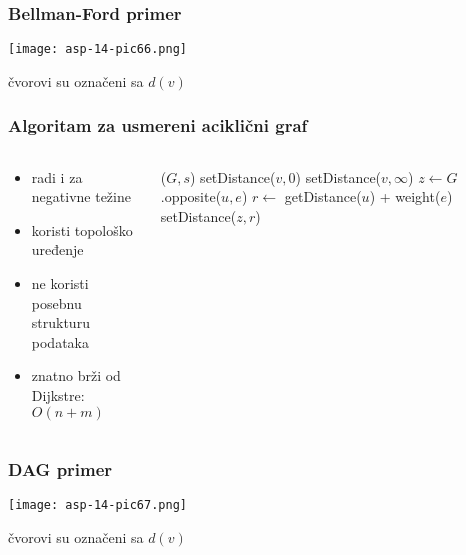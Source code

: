 \documentclass[compress,aspectratio=169]{beamer}
\begin{document}
\begin{frame}[fragile]
  \frametitle{Bellman-Ford primer}
  \begin{center}
    \texttt{[image: asp-14-pic66.png]}
  \end{center}
  \hfill {\scriptsize čvorovi su označeni sa $d(v)$}
\end{frame}

\begin{frame}[fragile,shrink=2]
  \frametitle{Algoritam za usmereni aciklični graf}
  \begin{columns}
    \begin{column}[t]{5cm}
      \begin{itemize}
        \item radi i za negativne težine
        \item koristi topološko uređenje
        \item ne koristi posebnu strukturu podataka
        \item znatno brži od Dijkstre: $O(n+m)$
      \end{itemize}
    \end{column}
    \begin{column}[t]{7cm}{\small
      \begin{algorithmic}
        \STATE {}($G,s$)
            \STATE setDistance($v,0$)
          \ELSE
            \STATE setDistance($v,\infty$)
          \ENDIF
        \ENDFOR
        \STATE {}
          \STATE {}
            \STATE {}
            \STATE $z \leftarrow G$.opposite($u,e$)
            \STATE $r \leftarrow$ getDistance($u$) + weight($e$)
              \STATE setDistance($z,r$)
            \ENDIF
          \ENDFOR
        \ENDFOR
      \end{algorithmic}}
    \end{column}
  \end{columns}
\end{frame}

\begin{frame}[fragile]
  \frametitle{DAG primer}
  \begin{center}
    \texttt{[image: asp-14-pic67.png]}
  \end{center}
  \hfill {\scriptsize čvorovi su označeni sa $d(v)$}
\end{frame}
\end{document}

